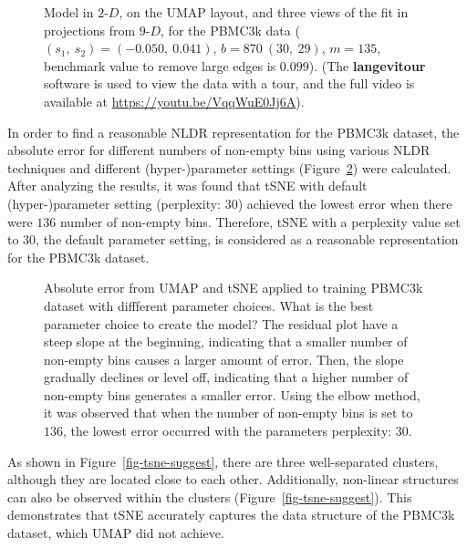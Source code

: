 \documentclass[
  12pt]{article}
\newcommand\gD{$2\text{-}D$}
\begin{document}
\begin{figure}[H]
\caption{\label{fig-pbmc1-sc}Model in \gD{}, on the UMAP layout, and
three views of the fit in projections from \(9\text{-}D\), for the
PBMC3k data (\((s_1, \ s_2) = (-0.050, \ 0.041)\),
\(b = 870 \  (30, \ 29)\), \(m = 135\), benchmark value to remove large
edges is \(0.099\)). (The \textbf{langevitour} software is used to view
the data with a tour, and the full video is available at
\url{https://youtu.be/VqqWuE0Jj6A}).}

\end{figure}%

In order to find a reasonable NLDR representation for the PBMC3k
dataset, the absolute error for different numbers of non-empty bins
using various NLDR techniques and different (hyper-)parameter settings
(Figure~\ref{fig-pbmc-abserror}) were calculated. After analyzing the
results, it was found that tSNE with default (hyper-)parameter setting
(perplexity: \(30\)) achieved the lowest error when there were \(136\)
number of non-empty bins. Therefore, tSNE with a perplexity value set to
\(30\), the default parameter setting, is considered as a reasonable
representation for the PBMC3k dataset.

\begin{figure}[H]


\caption{\label{fig-pbmc-abserror}Absolute error from UMAP and tSNE
applied to training PBMC3k dataset with diffferent parameter choices.
What is the best parameter choice to create the model? The residual plot
have a steep slope at the beginning, indicating that a smaller number of
non-empty bins causes a larger amount of error. Then, the slope
gradually declines or level off, indicating that a higher number of
non-empty bins generates a smaller error. Using the elbow method, it was
observed that when the number of non-empty bins is set to \(136\), the
lowest error occurred with the parameters perplexity: \(30\).}

\end{figure}%

As shown in Figure~\ref{fig-tsne-suggest}, there are three
well-separated clusters, although they are located close to each other.
Additionally, non-linear structures can also be observed within the
clusters (Figure~\ref{fig-tsne-suggest}). This demonstrates that tSNE
accurately captures the data structure of the PBMC3k dataset, which UMAP
did not achieve.
\end{document}

